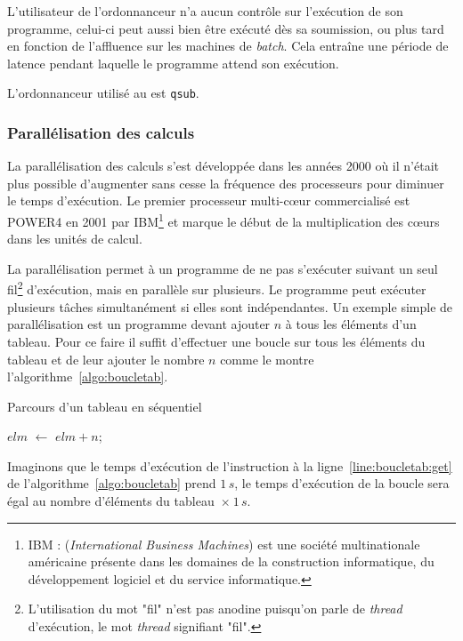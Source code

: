 L'utilisateur de l'ordonnanceur n'a aucun contrôle sur l'exécution de son programme, celui-ci peut aussi bien être exécuté dès sa soumission, ou plus tard en fonction de l'affluence sur les machines de \emph{batch}. Cela entraîne une période de latence pendant laquelle le programme attend son exécution.

L'ordonnanceur utilisé au \CC{} est \texttt{qsub}.


		\subsubsection{Parallélisation des calculs}

La parallélisation des calculs s'est développée dans les années 2000 où il n'était plus possible d'augmenter sans cesse la fréquence des processeurs pour diminuer le temps d'exécution. Le premier processeur multi-c\oe{}ur commercialisé est POWER4 en 2001 par IBM\footnote{IBM : (\emph{International Business Machines}) est une société multinationale américaine présente dans les domaines de la construction informatique, du développement logiciel et du service informatique.} et marque le début de la multiplication des c\oe{}urs dans les unités de calcul.

La parallélisation permet à un programme de ne pas s'exécuter suivant un seul fil\footnote{L'utilisation du mot "fil" n'est pas anodine puisqu'on parle de \emph{thread} d'exécution, le mot \emph{thread} signifiant "fil".} d'exécution, mais en parallèle sur plusieurs. Le programme peut exécuter plusieurs tâches simultanément si elles sont indépendantes. Un exemple simple de parallélisation est un programme devant ajouter $n$ à tous les éléments d'un tableau. Pour ce faire il suffit d'effectuer une boucle sur tous les éléments du tableau et de leur ajouter le nombre $n$ comme le montre l'algorithme~\ref{algo:boucletab}.

	\begin{algorithm}
		\caption{Parcours d'un tableau en séquentiel}
		\label{algo:boucletab}
		\begin{algorithmic}[1]
					\State $elm$ $\gets$ $elm+n$;\label{line:boucletab:get}
				\EndFor
			\EndFunction
		\end{algorithmic}
	\end{algorithm}

Imaginons que le temps d'exécution de l'instruction à la ligne~\ref{line:boucletab:get} de l'algorithme~\ref{algo:boucletab} prend $1\,s$, le temps d'exécution de la boucle sera égal au nombre d'éléments du tableau~$\times~1\,s$.

